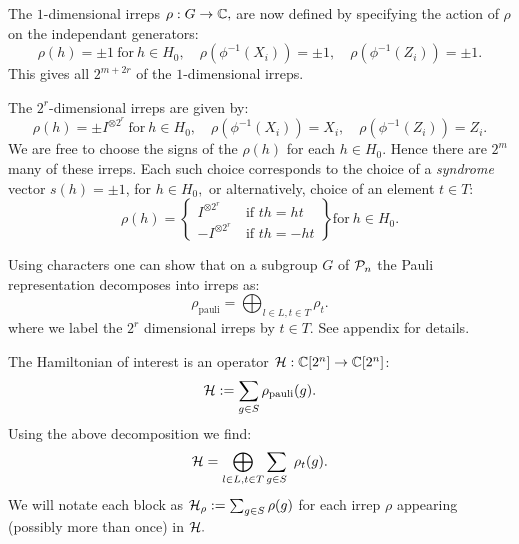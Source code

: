 \documentclass[12pt,notitlepage,longbibliography,nofootinbib,tightenlines]{revtex4}
\begin{document}
The $1$-dimensional irreps $\rho:G\to \mathbb{C},$
are now defined by
specifying the action of $\rho$ on the independant generators:
$$
    \rho(h)=\pm 1\ \mbox{for}\ h\in H_0,
    \quad \rho(\phi^{-1}(X_i)) = \pm 1,\quad \rho(\phi^{-1}(Z_i)) = \pm 1.
$$
This gives all $2^{m+2r}$ of the $1$-dimensional irreps.

The $2^r$-dimensional irreps are given by:
$$
    \rho(h) = \pm I^{\otimes 2^r}\ \mbox{for}\ h\in H_0,
    \quad \rho(\phi^{-1}(X_i)) = X_i,\quad \rho(\phi^{-1}(Z_i)) = Z_i.
$$
We are free to choose the signs of the $\rho(h)$ for each $h\in H_0.$
Hence there are $2^m$ many of these irreps.
Each such choice corresponds to the choice of a {\it syndrome} vector $s(h)=\pm 1$, for $h \in H_0,$
or alternatively, choice of an element $t\in T:$
$$
    \rho(h) = \left\{ \begin{array}{ll}
 I^{\otimes 2^r}\ &\mbox{if $th=ht$}\\
 -I^{\otimes 2^r}\ &\mbox{if $th=-ht$}\end{array} \right\}\mbox{for}\ h\in H_0.
$$


Using characters one can show that
on a subgroup $G$ of $\mathcal{P}_n$ the
Pauli representation decomposes into irreps as:
$$
    \rho_{\mathrm{pauli}} = \bigoplus_{l\in L, t\in T} \rho_t.
$$
where we label the $2^r$ dimensional irreps by $t\in T.$
See appendix for details.

The Hamiltonian of interest is 
an operator $\mathcal{H}:\mathbb{C}[2^n]\to\mathbb{C}[2^n]$:
$$ \mathcal{H} := \sum_{g\in S} \rho_{\mathrm{pauli}}(g).$$
Using the above decomposition we find:
$$
    \mathcal{H} = \bigoplus_{l\in L, t\in T} \sum_{g\in S}\ \rho_t(g).
$$
We will notate each block as
$\mathcal{H}_\rho := \sum_{g\in S}\rho(g)$
for each irrep $\rho$ appearing (possibly more than once)
in $\mathcal{H}.$
\end{document}
